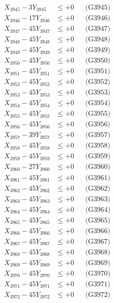 \documentclass[a4paper,10pt]{article}
\begin{document}
{\begin{align}
X_{3945} - 3Y_{3945} &\leq +0 && \text{(G3945)} \\
X_{3946} - 17Y_{3946} &\leq +0 && \text{(G3946)} \\
X_{3947} - 45Y_{3947} &\leq +0 && \text{(G3947)} \\
X_{3948} - 45Y_{3948} &\leq +0 && \text{(G3948)} \\
X_{3949} - 45Y_{3949} &\leq +0 && \text{(G3949)} \\
X_{3950} - 45Y_{3950} &\leq +0 && \text{(G3950)} \\
\allowbreak
X_{3951} - 45Y_{3951} &\leq +0 && \text{(G3951)} \\
X_{3952} - 45Y_{3952} &\leq +0 && \text{(G3952)} \\
X_{3953} - 45Y_{3953} &\leq +0 && \text{(G3953)} \\
X_{3954} - 45Y_{3954} &\leq +0 && \text{(G3954)} \\
X_{3955} - 45Y_{3955} &\leq +0 && \text{(G3955)} \\
X_{3956} - 45Y_{3956} &\leq +0 && \text{(G3956)} \\
X_{3957} - 39Y_{3957} &\leq +0 && \text{(G3957)} \\
X_{3958} - 45Y_{3958} &\leq +0 && \text{(G3958)} \\
X_{3959} - 45Y_{3959} &\leq +0 && \text{(G3959)} \\
X_{3960} - 27Y_{3960} &\leq +0 && \text{(G3960)} \\
\allowbreak
X_{3961} - 45Y_{3961} &\leq +0 && \text{(G3961)} \\
X_{3962} - 45Y_{3962} &\leq +0 && \text{(G3962)} \\
X_{3963} - 45Y_{3963} &\leq +0 && \text{(G3963)} \\
X_{3964} - 45Y_{3964} &\leq +0 && \text{(G3964)} \\
X_{3965} - 45Y_{3965} &\leq +0 && \text{(G3965)} \\
X_{3966} - 45Y_{3966} &\leq +0 && \text{(G3966)} \\
X_{3967} - 45Y_{3967} &\leq +0 && \text{(G3967)} \\
X_{3968} - 45Y_{3968} &\leq +0 && \text{(G3968)} \\
X_{3969} - 45Y_{3969} &\leq +0 && \text{(G3969)} \\
X_{3970} - 45Y_{3970} &\leq +0 && \text{(G3970)} \\
\allowbreak
X_{3971} - 45Y_{3971} &\leq +0 && \text{(G3971)} \\
X_{3972} - 45Y_{3972} &\leq +0 && \text{(G3972)} \\

\end{align}}
\end{document}
